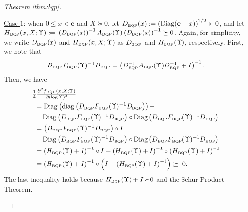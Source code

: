 \documentclass[smallextended]{svjour3hack}       %
\DeclareMathOperator{\Diag}{Diag}
\DeclareMathOperator{\diag}{diag}
\begin{document}
\begin{proof}[Theorem \ref{thm:bqp}]
\begin{itemize}
    \smallskip
    \underline{Case $1$}: when $0\le x<\mathbf{e}$ and $X\succeq 0$,  let $D_{{\tiny\mbox{BQP}}}(x):=\left(\Diag(\mathbf{e}-x)\right)^{1/2} \succ 0$, and let $H_{{\tiny\mbox{BQP}}}(x,X;\Upsilon):=$
    $\left(D_{{\tiny\mbox{BQP}}}(x)\right)^{-1} A_{{\tiny\mbox{BQP}}}(\Upsilon) \left(D_{{\tiny\mbox{BQP}}}(x)\right)^{-1}\succeq 0$. Again, for simplicity, we write $D_{{\tiny\mbox{BQP}}}(x)$ and $H_{{\tiny\mbox{BQP}}}(x,X;\Upsilon)$ as $D_{{\tiny\mbox{BQP}}}$ and $H_{{\tiny\mbox{BQP}}}(\Upsilon)$, respectively. First, we note that
    \begin{align*}
        D_{{\tiny\mbox{BQP}}}  F_{{\tiny\mbox{BQP}}}(\Upsilon)^{-1}D_{{\tiny\mbox{BQP}}} =\left( D_{{\tiny\mbox{BQP}}}^{-1} A_{{\tiny\mbox{BQP}}}(\Upsilon) D_{{\tiny\mbox{BQP}}}^{-1} + I\right)^{-1}.
    \end{align*}
    Then, we have
    \begin{align*}
        & \textstyle{\frac{1}{4}} \frac{\partial^2 f_{{\tiny\mbox{BQP}}}\left(x,X;\Upsilon\right)}{\partial \left(\log \Upsilon\right) ^2} \\
        &~= \Diag\left(\diag\left( D_{{\tiny\mbox{BQP}}}  F_{{\tiny\mbox{BQP}}}(\Upsilon)^{-1}D_{{\tiny\mbox{BQP}}}\right)\right) -\\
        & ~\quad \Diag\left( D_{{\tiny\mbox{BQP}}}  F_{{\tiny\mbox{BQP}}}(\Upsilon)^{-1}D_{{\tiny\mbox{BQP}}}\right) \circ \Diag\left( D_{{\tiny\mbox{BQP}}}  F_{{\tiny\mbox{BQP}}}(\Upsilon)^{-1}D_{{\tiny\mbox{BQP}}}\right)\\
        & ~=\left( D_{{\tiny\mbox{BQP}}}  F_{{\tiny\mbox{BQP}}}(\Upsilon)^{-1}D_{{\tiny\mbox{BQP}}}\right)\circ I -\\
        & ~\quad \Diag\left( D_{{\tiny\mbox{BQP}}}  F_{{\tiny\mbox{BQP}}}(\Upsilon)^{-1}D_{{\tiny\mbox{BQP}}}\right) \circ \Diag\left( D_{{\tiny\mbox{BQP}}}  F_{{\tiny\mbox{BQP}}}(\Upsilon)^{-1}D_{{\tiny\mbox{BQP}}}\right)\\
        & ~=\left(H_{{\tiny\mbox{BQP}}}(\Upsilon)+I \right)^{-1}\circ I - \left(H_{{\tiny\mbox{BQP}}}(\Upsilon)+I \right)^{-1} \circ \left(H_{{\tiny\mbox{BQP}}}(\Upsilon)+I \right)^{-1}\\
        & ~=\left(H_{{\tiny\mbox{BQP}}}(\Upsilon)+I \right)^{-1} \circ \left(I - \left(H_{{\tiny\mbox{BQP}}}(\Upsilon)+I \right)^{-1} \right)
        \succeq~ 0.
    \end{align*}
    The last inequality holds because $H_{{\tiny\mbox{BQP}}}(\Upsilon)+I  \! \succ \! 0$ and
    the Schur Product Theorem.


\end{itemize}
\end{proof}
\end{document}
